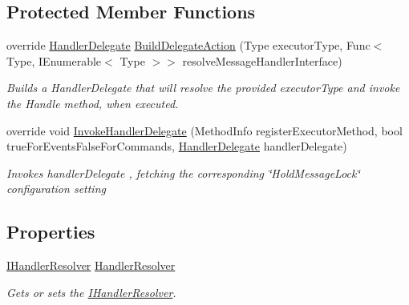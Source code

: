 \subsection*{Protected Member Functions}
\begin{DoxyCompactItemize}
\item 
override \hyperlink{classCqrs_1_1Configuration_1_1HandlerDelegate}{Handler\+Delegate} \hyperlink{classCqrs_1_1Akka_1_1Configuration_1_1AkkaBusRegistrar_ad7e3e5d332d5b4d781375a28f23bdb19_ad7e3e5d332d5b4d781375a28f23bdb19}{Build\+Delegate\+Action} (Type executor\+Type, Func$<$ Type, I\+Enumerable$<$ Type $>$$>$ resolve\+Message\+Handler\+Interface)
\begin{DoxyCompactList}\small\item\em Builds a Handler\+Delegate that will resolve the provided {\itshape executor\+Type}  and invoke the Handle method, when executed. \end{DoxyCompactList}\item 
override void \hyperlink{classCqrs_1_1Akka_1_1Configuration_1_1AkkaBusRegistrar_a0ac474751b2ba8ebb27b885a15fbf053_a0ac474751b2ba8ebb27b885a15fbf053}{Invoke\+Handler\+Delegate} (Method\+Info register\+Executor\+Method, bool true\+For\+Events\+False\+For\+Commands, \hyperlink{classCqrs_1_1Configuration_1_1HandlerDelegate}{Handler\+Delegate} handler\+Delegate)
\begin{DoxyCompactList}\small\item\em Invokes {\itshape handler\+Delegate} , fetching the corresponding \char`\"{}\+Hold\+Message\+Lock\char`\"{} configuration setting \end{DoxyCompactList}\end{DoxyCompactItemize}
\subsection*{Properties}
\begin{DoxyCompactItemize}
\item 
\hyperlink{interfaceCqrs_1_1Akka_1_1Configuration_1_1IHandlerResolver}{I\+Handler\+Resolver} \hyperlink{classCqrs_1_1Akka_1_1Configuration_1_1AkkaBusRegistrar_a642cd7215c2f51cfaff263f9ba95a4c4_a642cd7215c2f51cfaff263f9ba95a4c4}{Handler\+Resolver}
\begin{DoxyCompactList}\small\item\em Gets or sets the \hyperlink{interfaceCqrs_1_1Akka_1_1Configuration_1_1IHandlerResolver}{I\+Handler\+Resolver}. \end{DoxyCompactList}\end{DoxyCompactItemize}


